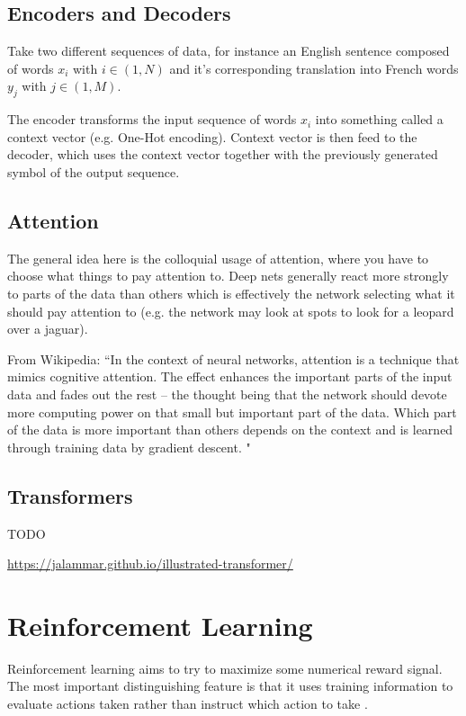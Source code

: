 \subsection{Encoders and Decoders}
Take two different sequences of data, for instance an English sentence composed of words $x_i$ with $i\in (1,N)$ and it's corresponding translation into French words $y_j$ with $j\in(1,M)$.

The encoder transforms the input sequence of words $x_i$ into something called a context vector (e.g. One-Hot encoding). Context vector is then feed to the decoder, which uses the context vector together with the previously generated symbol of the output sequence. 

\subsection{Attention}

The general idea here is the colloquial usage of attention, where you have to choose what things to pay attention to. Deep nets generally react more strongly to parts of the data than others which is effectively the network selecting what it should pay attention to (e.g. the network may look at spots to look for a leopard over a jaguar).



From Wikipedia: ``In the context of neural networks, attention is a technique that mimics cognitive attention. The effect enhances the important parts of the input data and fades out the rest -- the thought being that the network should devote more computing power on that small but important part of the data. Which part of the data is more important than others depends on the context and is learned through training data by gradient descent. "


\subsection{Transformers}
TODO

\url{https://jalammar.github.io/illustrated-transformer/}


\section{Reinforcement Learning}
Reinforcement learning aims to try to maximize some numerical reward signal. The most important distinguishing feature is that it uses training information to evaluate actions taken rather than instruct which action to take \cite{sutton}.



